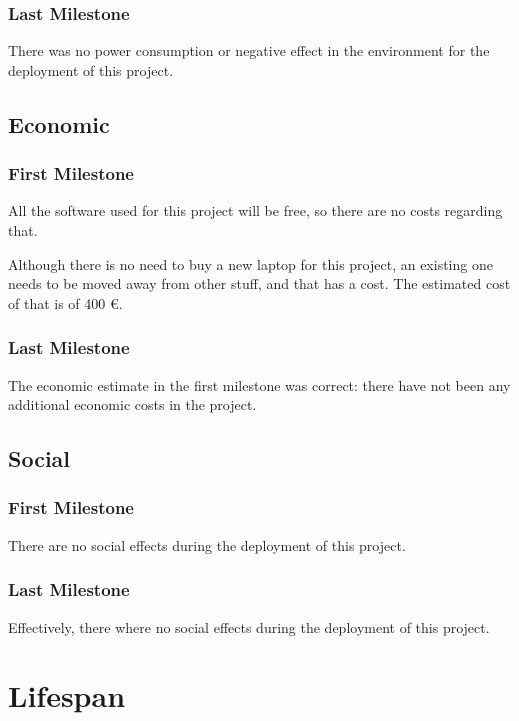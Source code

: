     \subsubsection*{Last Milestone}

    There was no power consumption or negative effect in the environment for the deployment
    of this project.

    \subsection{Economic}
      \subsubsection*{First Milestone}

      All the software used for this project will be free, so there are no costs
      regarding that.

      Although there is no need to buy a new laptop for this project, an existing
      one needs to be moved away from other stuff, and that has a cost. The
      estimated cost of that is of 400 €.

      \subsubsection*{Last Milestone}

      The economic estimate in the first milestone was correct: there have not
      been any additional economic costs in the project.

    \subsection{Social}
      \subsubsection*{First Milestone}

      There are no social effects during the deployment of this project.

      \subsubsection*{Last Milestone}

      Effectively, there where no social effects during the deployment
      of this project.

  \section{Lifespan}
